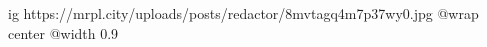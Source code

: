  
 
 
 
 

\ifcmt
  ig https://mrpl.city/uploads/posts/redactor/8mvtagq4m7p37wy0.jpg
  @wrap center
  @width 0.9
\fi
